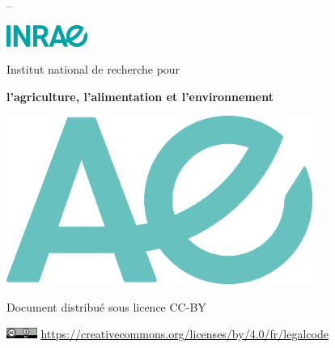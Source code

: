 
\thispagestyle{empty}
\vspace*{4cm}
\setlength{\parindent}{0cm}
\textcolor{inrae}{\sffamily\Huge\bfseries\titre}\par\bigskip
\textcolor{inrae}{\sffamily\dateVersion{} -- \version}\par

\vspace*{3cm}
\includegraphics{inrae}\par\bigskip
\textcolor{inrae}{\sffamily\Large Institut national de recherche pour}\par
\textcolor{inrae}{\sffamily\Large\bfseries l'agriculture, l'alimentation et l'environnement}\par\bigskip


\vspace*{2cm}
\hspace{-5cm}
{\includegraphics[width=10cm]{sigle-inrae-plein}}

\vspace*{2cm}
\textcolor{inrae}{\sffamily\auteur}\par

\textcolor{inrae}{\sffamily
Document distribué sous licence CC-BY}\par
  \includegraphics[width=1cm]{cc-by} \href{https://creativecommons.org/licenses/by/4.0/fr/legalcode}{https://creativecommons.org/licenses/by/4.0/fr/legalcode}
  
\restoregeometry
